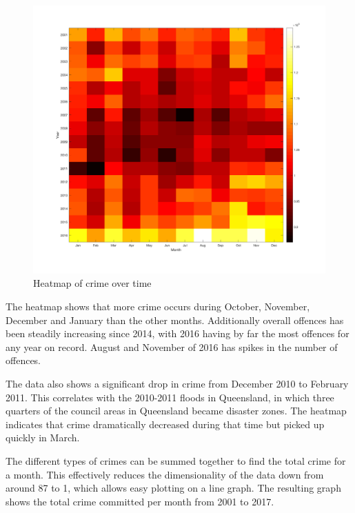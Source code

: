 \documentclass[]{article}
\begin{document}
\begin{figure}[H]
    \caption{Heatmap of crime over time}
    \centering
    \includegraphics[width=\linewidth]{../images/crime_time_heatmap}
\end{figure}

The heatmap shows that more crime occurs during October, November, December and January than the other months. 
Additionally overall offences has been steadily increasing since 2014, with
2016 having by far the most offences for any year on record.
August and November of 2016 has spikes in the number of offences.

The data also shows a significant drop in crime from December 2010 to February 2011.
This correlates with the 2010-2011 floods in Queensland, in which three quarters of the council areas
in Queensland became disaster zones\cite{noauthor_201011_2017}.
The heatmap indicates that crime dramatically decreased during that time but picked up quickly in March.

The different types of crimes can be summed together to find the total crime for a month.
This effectively reduces the dimensionality of the data down from around 87 to 1, which allows easy plotting on a line graph.
The resulting graph shows the total crime committed per month from 2001 to 2017.
\end{document}
